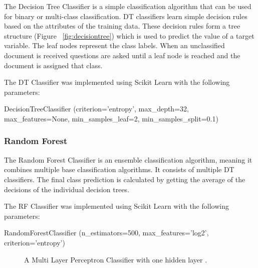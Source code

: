 The Decision Tree Classifier is a simple classification algorithm that can be used for binary or multi-class classification. DT classifiers learn simple decision rules based on the attributes of the training data. These decision rules form a tree structure (Figure ~\ref{fig:decisiontree}) which is used to predict the value of a target variable. The leaf nodes represent the class labels. When an unclassified document is received questions are asked until a leaf node is reached and the document is assigned that class.

The DT Classifier was implemented using Scikit Learn with the following parameters:

\begin{tcolorbox}
\begin{center}
	DecisionTreeClassifier (criterion='entropy', max\_depth=32, max\_features=None, min\_samples\_leaf=2, min\_samples\_split=0.1)
\end{center}
\end{tcolorbox}

\subsubsection*{Random Forest}

The Random Forest Classifier is an ensemble classification algorithm, meaning it combines multiple base classification algorithms. It consists of multiple DT classifiers. The final class prediction is calculated by getting the average of the decisions of the individual decision trees.

The RF Classifier was implemented using Scikit Learn with the following parameters:

\begin{tcolorbox}
\begin{center}
	RandomForestClassifier (n\_estimators=500, max\_features='log2', criterion='entropy')
\end{center}
\end{tcolorbox}

\begin{figure}[h!]
\centering
{}
\caption{\label{fig:mlp} A Multi Layer Perceptron Classifier with one hidden layer \cite{scikit-learn}.}
\end{figure}

